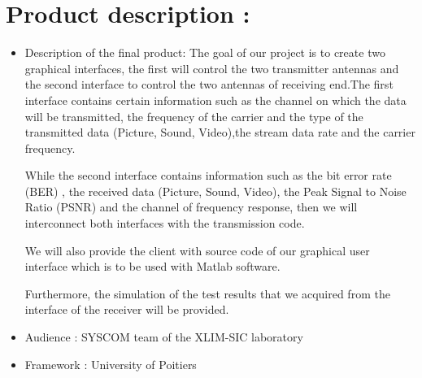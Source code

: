 \documentclass[12pt,a4paper]{article}
\begin{document}
\section{Product description :}
\begin{itemize}
\item Description of the final product:
The goal of our project is to create two graphical interfaces, the first will control the two transmitter antennas and the second interface to control the two antennas of receiving end.The first interface contains certain information such as the channel on which the data will be transmitted, the frequency of the carrier and the type of the transmitted data (Picture, Sound, Video),the stream data rate and the carrier frequency.

While the second interface contains information such as the bit error rate (BER) , the received data (Picture, Sound, Video), the Peak Signal to Noise Ratio (PSNR) and the channel of frequency response,
then we will interconnect both interfaces with the transmission code.

We will also provide the client with source code of our graphical user interface which is to be used with Matlab software. 

Furthermore, the simulation of the test results that we acquired from the interface of the receiver will be provided. 

\item Audience : SYSCOM team of the XLIM-SIC laboratory 
\item Framework : University of Poitiers
\end{itemize}
\end{document}
